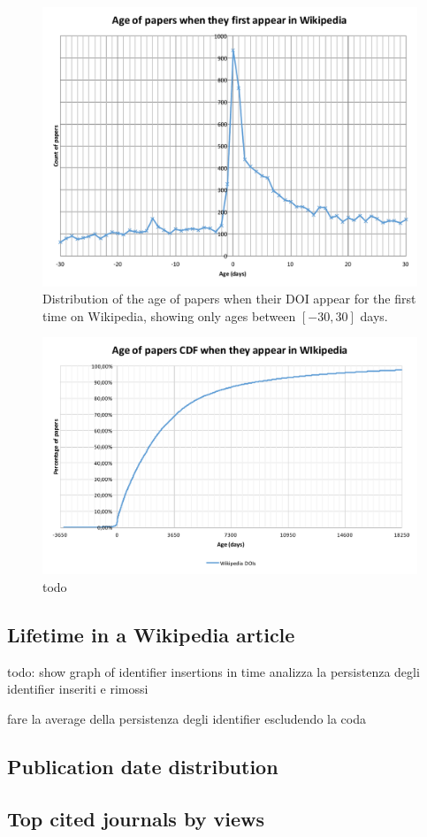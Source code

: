 \begin{figure}[h]
\centering
\includegraphics[keepaspectratio=true, width=\textwidth]{assets/age_of_papers_at_first_appearance_-30+30}
\caption{Distribution of the age of papers when their DOI appear for the first time on Wikipedia, showing only ages between $[-30, 30]$ days.}
\label{fig:age_of_papers_at_first_appearance_zoom}
\end{figure}

\begin{figure}[h]
\centering
\includegraphics[keepaspectratio=true, width=\textwidth]{assets/age_of_papers_at_first_appearance_cdf}
\caption{todo}
\label{fig:age_of_papers_at_first_appearance_cdf}
\end{figure}

\subsection{Lifetime in a Wikipedia article}
todo: show graph of identifier insertions in time
analizza la persistenza degli identifier inseriti e rimossi

fare la average della persistenza degli identifier escludendo la coda
\subsection{Publication date distribution}
\subsection{Top cited journals by views}
